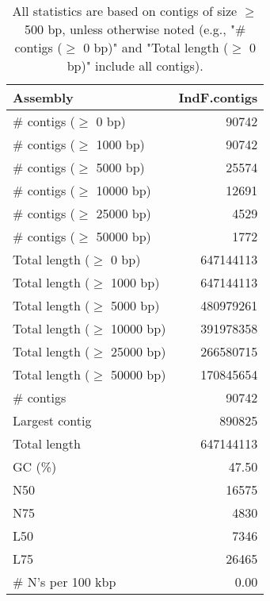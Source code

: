 \documentclass[12pt,a4paper]{article}
\begin{document}
\begin{table}[ht]
\begin{center}
\caption{All statistics are based on contigs of size $\geq$ 500 bp, unless otherwise noted (e.g., "\# contigs ($\geq$ 0 bp)" and "Total length ($\geq$ 0 bp)" include all contigs).}
\begin{tabular}{|l*{1}{|r}|}
\hline
Assembly & IndF.contigs \\ \hline
\# contigs ($\geq$ 0 bp) & 90742 \\ \hline
\# contigs ($\geq$ 1000 bp) & 90742 \\ \hline
\# contigs ($\geq$ 5000 bp) & 25574 \\ \hline
\# contigs ($\geq$ 10000 bp) & 12691 \\ \hline
\# contigs ($\geq$ 25000 bp) & 4529 \\ \hline
\# contigs ($\geq$ 50000 bp) & 1772 \\ \hline
Total length ($\geq$ 0 bp) & 647144113 \\ \hline
Total length ($\geq$ 1000 bp) & 647144113 \\ \hline
Total length ($\geq$ 5000 bp) & 480979261 \\ \hline
Total length ($\geq$ 10000 bp) & 391978358 \\ \hline
Total length ($\geq$ 25000 bp) & 266580715 \\ \hline
Total length ($\geq$ 50000 bp) & 170845654 \\ \hline
\# contigs & 90742 \\ \hline
Largest contig & 890825 \\ \hline
Total length & 647144113 \\ \hline
GC (\%) & 47.50 \\ \hline
N50 & 16575 \\ \hline
N75 & 4830 \\ \hline
L50 & 7346 \\ \hline
L75 & 26465 \\ \hline
\# N's per 100 kbp & 0.00 \\ \hline
\end{tabular}
\end{center}
\end{table}
\end{document}
